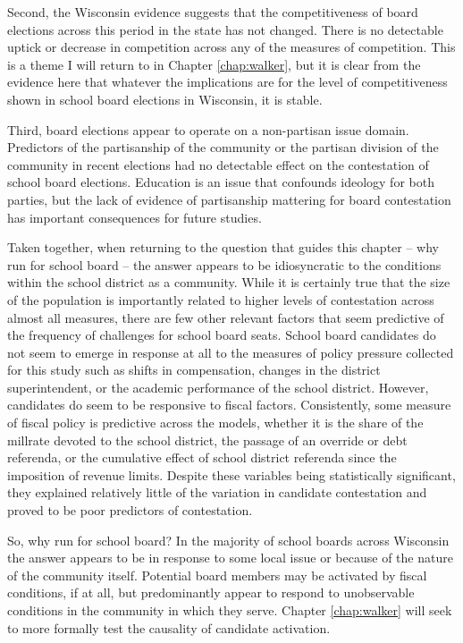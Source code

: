 Second, the Wisconsin evidence suggests that the competitiveness of board elections 
across this period in the state has not changed. There is no detectable uptick or 
decrease in competition across any of the measures of competition. This is a theme 
I will return to in Chapter \ref{chap:walker}, but it is clear from the evidence 
here that whatever the implications are for the level of competitiveness shown 
in school board elections in Wisconsin, it is stable. 

Third, board elections appear to operate on a non-partisan issue domain. Predictors 
of the partisanship of the community or the partisan division of the community 
in recent elections had no detectable effect on the contestation of school board 
elections. Education is an issue that confounds ideology for both parties, but 
the lack of evidence of partisanship mattering for board contestation has important 
consequences for future studies. 

Taken together, when returning to the question that guides this chapter -- why 
run for school board -- the answer appears to be idiosyncratic to the conditions 
within the school district as a community. While it is certainly true that the 
size of the population is importantly related to higher levels of contestation 
across almost all measures, there are few other relevant factors that seem 
predictive of the frequency of challenges for school board seats. School board 
candidates do not seem to emerge in response at all to the measures of policy pressure 
collected for this study such as shifts in compensation, changes in the district 
superintendent, or the academic performance of the school district. However, 
candidates do seem to be responsive to fiscal factors. Consistently, some 
measure of fiscal policy is predictive across the models, whether it is the share 
of the millrate devoted to the school district, the passage of an override or debt 
referenda, or the cumulative effect of school district referenda since the imposition 
of revenue limits. Despite these variables being statistically significant, they 
explained relatively little of the variation in candidate contestation and proved 
to be poor predictors of contestation. 

So, why run for school board? In the majority of school boards across Wisconsin 
the answer appears to be in response to some local issue or because of the nature 
of the community itself. Potential board members may be activated by fiscal conditions, 
if at all, but predominantly appear to respond to unobservable conditions in the 
community in which they serve. Chapter \ref{chap:walker} will seek to more formally 
test the causality of candidate activation. 

